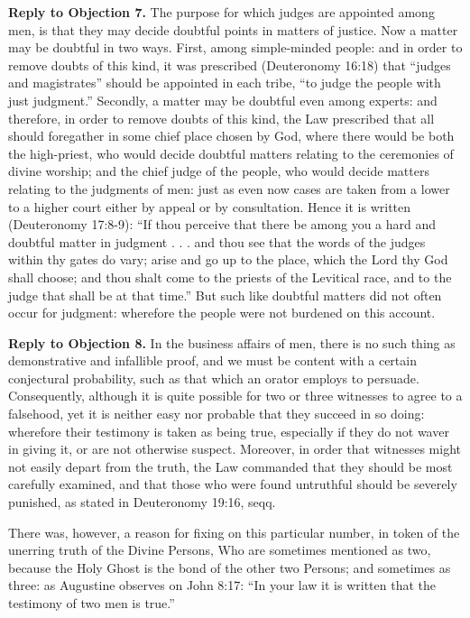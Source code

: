 \textbf{Reply to Objection 7.} The purpose for which judges are appointed among men, is that they may decide doubtful points in matters of justice. Now a matter may be doubtful in two ways. First, among simple-minded people: and in order to remove doubts of this kind, it was prescribed (Deuteronomy 16:18) that ``judges and magistrates'' should be appointed in each tribe, ``to judge the people with just judgment.'' Secondly, a matter may be doubtful even among experts: and therefore, in order to remove doubts of this kind, the Law prescribed that all should foregather in some chief place chosen by God, where there would be both the high-priest, who would decide doubtful matters relating to the ceremonies of divine worship; and the chief judge of the people, who would decide matters relating to the judgments of men: just as even now cases are taken from a lower to a higher court either by appeal or by consultation. Hence it is written (Deuteronomy 17:8-9): ``If thou perceive that there be among you a hard and doubtful matter in judgment . . . and thou see that the words of the judges within thy gates do vary; arise and go up to the place, which the Lord thy God shall choose; and thou shalt come to the priests of the Levitical race, and to the judge that shall be at that time.'' But such like doubtful matters did not often occur for judgment: wherefore the people were not burdened on this account.

\textbf{Reply to Objection 8.} In the business affairs of men, there is no such thing as demonstrative and infallible proof, and we must be content with a certain conjectural probability, such as that which an orator employs to persuade. Consequently, although it is quite possible for two or three witnesses to agree to a falsehood, yet it is neither easy nor probable that they succeed in so doing: wherefore their testimony is taken as being true, especially if they do not waver in giving it, or are not otherwise suspect. Moreover, in order that witnesses might not easily depart from the truth, the Law commanded that they should be most carefully examined, and that those who were found untruthful should be severely punished, as stated in Deuteronomy 19:16, seqq.

There was, however, a reason for fixing on this particular number, in token of the unerring truth of the Divine Persons, Who are sometimes mentioned as two, because the Holy Ghost is the bond of the other two Persons; and sometimes as three: as Augustine observes on John 8:17: ``In your law it is written that the testimony of two men is true.''

